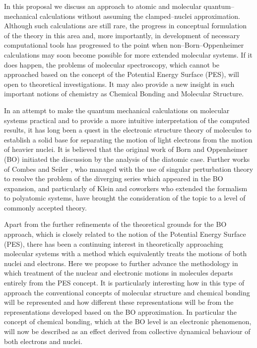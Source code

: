 In this proposal we discuss an approach to atomic and 
molecular quantum--mechanical calculations without assuming 
the clamped--nuclei approximation. Although such calculations
are still rare, the progress
in conceptual formulation of the theory in this area and, more
importantly, in development of necessary computational tools
has progressed to the point when non--Born--Oppenheimer
calculations may soon become possible for more extended molecular
systems. If it does happen, 
the problems of molecular spectroscopy,
which cannot be approached based 
on the concept of the Potential Energy Surface (PES),
will open to theoretical investigations.
It may also provide a new insight in such important notions of
chemistry as Chemical Bonding and Molecular Structure.

In an attempt to make the quantum mechanical calculations on 
molecular systems practical and to provide a more intuitive
interpretation of the computed results, it has long been a quest
in the electronic structure theory of molecules 
to establish a solid base for separating
the motion of light electrons from the motion of heavier nuclei.
It is believed that the original work of Born and Oppenheimer (BO)
\cite{BO1927} initiated the discussion by the analysis
of the diatomic case. Further works of Combes and Seiler
\cite{CS1980}, who managed with the use of singular perturbation
theory to resolve the problem of the diverging series which appeared
in the BO expansion, and particularly of Klein and coworkers
\cite{KM1992} who extended the formalism to polyatomic systems,
have brought the consideration of the topic to a level of commonly
accepted theory.

Apart from the further refinements of the theoretical grounds
for the BO approach, which is closely related to the notion
of the Potential Energy Surface (PES), there has been a continuing
interest in theoretically approaching molecular systems 
with a method which equivalently treats
the motions of both nuclei and electrons.
Here we propose to further advance the methodology 
in which treatment of the nuclear and electronic motions
in molecules departs entirely from the PES concept. 
It is particularly
interesting how in this type of approach the conventional concepts
of molecular structure and chemical bonding will be represented
and how different these representations will be 
from the representations
developed based on the BO approximation. In particular the concept
of chemical bonding, which at the BO level is an electronic 
phenomenon, will now be described as an effect derived from
collective dynamical behaviour of both electrons and nuclei.

